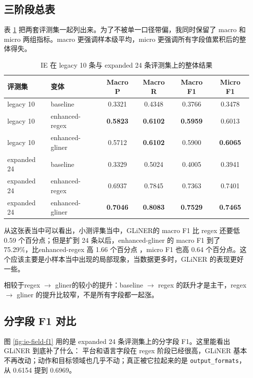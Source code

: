 \subsection{三阶段总表}
表 \ref{tab:ie-overall} 把两套评测集一起列出来。为了不被单一口径带偏，我同时保留了 macro 和 micro 两组指标。macro 更强调样本级平均，micro 更强调所有字段值累积后的整体得失。
\begin{table}[H]
\centering
\caption{IE 在 legacy 10 条与 expanded 24 条评测集上的整体结果}
\label{tab:ie-overall}
\begin{tabular}{llcccc}
\toprule
评测集 & 变体 & Macro P & Macro R & Macro F1 & Micro F1 \\
\midrule
legacy 10 & baseline & 0.3321 & 0.4348 & 0.3766 & 0.3478 \\
legacy 10 & enhanced-regex & \textbf{0.5823} & \textbf{0.6102} & \textbf{0.5959} & 0.6013 \\
legacy 10 & enhanced-gliner & 0.5712 & \textbf{0.6102} & 0.5900 & \textbf{0.6065} \\
\midrule
expanded 24 & baseline & 0.3329 & 0.5024 & 0.4005 & 0.3941 \\
expanded 24 & enhanced-regex & 0.6937 & 0.7845 & 0.7363 & 0.7401 \\
expanded 24 & enhanced-gliner & \textbf{0.7046} & \textbf{0.8083} & \textbf{0.7529} & \textbf{0.7465} \\
\bottomrule
\end{tabular}
\end{table}

从这张表当中可以看出，小测评集当中，GLiNER的 macro F1 比 regex 还要低 0.59 个百分点；但是扩到 24 条以后，enhanced-gliner 的 macro F1 到了 75.29\%，比enhanced-regex 高 1.66 个百分点
，micro F1 也高 0.64 个百分点。这个应该主要是小样本当中出现的局部现象，当数据更多时，GLiNER 的表现更好一些。

相较于regex $\rightarrow$ gliner的较小的提升：baseline $\rightarrow$ regex 的跃升才是主干，regex $\rightarrow$ gliner 的提升比较窄，不是所有字段都一起涨。

\subsection{分字段 F1 对比}
图 \ref{fig:ie-field-f1} 用的是 expanded 24 条评测集上的分字段 F1。这里能看出 GLiNER 到底补了什么：
平台和语言字段在 regex 阶段已经很高，GLiNER 基本不再改动；动作和目标领域也几乎不动；真正被它拉起来的是 \texttt{output\_formats}，从 0.6154 提到 0.6969。

